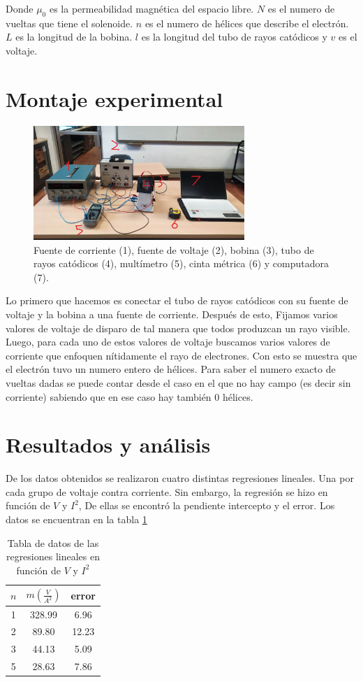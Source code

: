 \documentclass[a4paper, amsfonts, amssymb, amsmath, reprint, showkeys, nofootinbib, twoside]{revtex4-1}
\begin{document}
Donde $\mu_0$ es la permeabilidad magnética del espacio libre. $N$ es el numero de vueltas que tiene el solenoide. $n$ es el numero de hélices que describe el electrón.  $L$ es la longitud de la bobina.  $l$ es la longitud del tubo de rayos catódicos y  $v$ es el voltaje.
\section{Montaje experimental}

\begin{figure}[h]
    \centering
    \includegraphics[width=8cm]{cma_montaje_marcado.jpeg}
    \caption{Fuente de corriente (1), fuente de voltaje (2), bobina (3), tubo de rayos catódicos (4), multímetro (5), cinta métrica (6) y computadora (7).   }
    \label{fig:MontajeG}
\end{figure}

Lo primero que hacemos es conectar el tubo de rayos catódicos con su fuente de voltaje y la bobina a una fuente de corriente. Después de esto, Fijamos varios valores de voltaje de disparo de tal manera que todos produzcan un rayo visible. Luego, para cada uno de estos valores de voltaje buscamos varios valores de corriente que enfoquen nítidamente el rayo de electrones. Con esto se muestra que el electrón tuvo un numero entero de hélices. Para saber el numero exacto de vueltas dadas se puede contar desde el caso en el que no hay campo (es decir sin corriente) sabiendo que en ese caso hay también 0 hélices.

\section{Resultados y análisis}

De los datos obtenidos se realizaron cuatro distintas regresiones lineales. Una por cada grupo de voltaje contra corriente. Sin embargo, la regresión se hizo en función de $V$ y  $I^2$, De ellas se encontró la pendiente intercepto y el error. Los datos se encuentran en la tabla \ref{tab:Pend}
 \begin{table}[htpb]
  \centering
  \caption{Tabla de datos de las regresiones lineales en función de $V$ y  $I^2$}
  \label{tab:Pend}
  \begin{tabular}{|c|c|c|}
    \hline
  $n$ & $m\left( \frac{V}{A^2} \right) $ & error \\
  \hline
  1 & 328.99 & 6.96 \\
  2 & 89.80 & 12.23 \\
  3 & 44.13 & 5.09 \\
  5 & 28.63 & 7.86 \\
  \hline
  \end{tabular}
\end{table}
\end{document}
